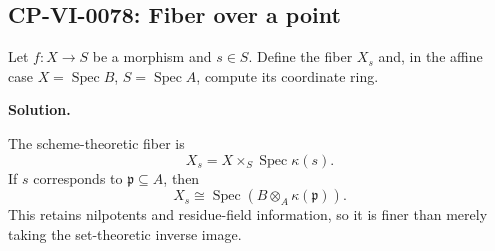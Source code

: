 
\subsection*{CP-VI-0078: Fiber over a point}

Let $f:X\to S$ be a morphism and $s\in S$. Define the fiber $X_s$ and, in the affine case $X=\operatorname{Spec}B$, $S=\operatorname{Spec}A$, compute its coordinate ring.

\medskip
\noindent\textbf{Solution.}

The scheme-theoretic fiber is
\[
X_s=X\times_S\operatorname{Spec}\kappa(s).
\]
If $s$ corresponds to $\mathfrak p\subseteq A$, then
\[
X_s\cong\operatorname{Spec}(B\otimes_A\kappa(\mathfrak p)).
\]
This retains nilpotents and residue-field information, so it is finer than merely taking the set-theoretic inverse image.

